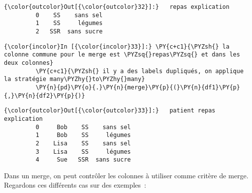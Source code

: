 \begin{Verbatim}[commandchars=\\\{\},frame=single,framerule=0.3mm,rulecolor=\color{cellframecolor}]
{\color{outcolor}Out[{\color{outcolor}32}]:}   repas explication
         0    SS    sans sel
         1    SS     légumes
         2   SSR  sans sucre
\end{Verbatim}
            
    \begin{Verbatim}[commandchars=\\\{\},frame=single,framerule=0.3mm,rulecolor=\color{cellframecolor}]
{\color{incolor}In [{\color{incolor}33}]:} \PY{c+c1}{\PYZsh{} la colonne commune pour le merge est \PYZsq{}repas\PYZsq{} et dans les deux colonnes}
         \PY{c+c1}{\PYZsh{} il y a des labels dupliqués, on applique la stratégie many\PYZhy{}to\PYZhy{}many}
         \PY{n}{pd}\PY{o}{.}\PY{n}{merge}\PY{p}{(}\PY{n}{df1}\PY{p}{,}\PY{n}{df2}\PY{p}{)}
\end{Verbatim}


\begin{Verbatim}[commandchars=\\\{\},frame=single,framerule=0.3mm,rulecolor=\color{cellframecolor}]
{\color{outcolor}Out[{\color{outcolor}33}]:}   patient repas explication
         0     Bob    SS    sans sel
         1     Bob    SS     légumes
         2    Lisa    SS    sans sel
         3    Lisa    SS     légumes
         4     Sue   SSR  sans sucre
\end{Verbatim}
            
    Dans un merge, on peut contrôler les colonnes à utiliser comme critère
de merge. Regardons ces différents cas sur des exemples~:

